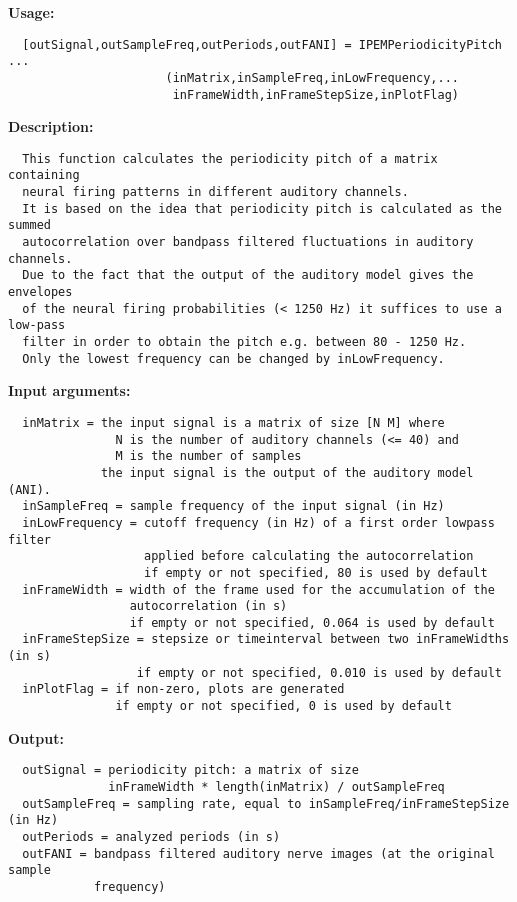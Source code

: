 \textbf{Usage:}
\begin{verbatim}  [outSignal,outSampleFreq,outPeriods,outFANI] = IPEMPeriodicityPitch ...
                      (inMatrix,inSampleFreq,inLowFrequency,...
                       inFrameWidth,inFrameStepSize,inPlotFlag)

\end{verbatim}
\textbf{Description:}
\begin{verbatim}  This function calculates the periodicity pitch of a matrix containing 
  neural firing patterns in different auditory channels. 
  It is based on the idea that periodicity pitch is calculated as the summed
  autocorrelation over bandpass filtered fluctuations in auditory channels. 
  Due to the fact that the output of the auditory model gives the envelopes
  of the neural firing probabilities (< 1250 Hz) it suffices to use a low-pass
  filter in order to obtain the pitch e.g. between 80 - 1250 Hz.
  Only the lowest frequency can be changed by inLowFrequency.

\end{verbatim}
\textbf{Input arguments:}
\begin{verbatim}  inMatrix = the input signal is a matrix of size [N M] where
               N is the number of auditory channels (<= 40) and 
               M is the number of samples
             the input signal is the output of the auditory model (ANI).
  inSampleFreq = sample frequency of the input signal (in Hz)
  inLowFrequency = cutoff frequency (in Hz) of a first order lowpass filter
                   applied before calculating the autocorrelation
                   if empty or not specified, 80 is used by default
  inFrameWidth = width of the frame used for the accumulation of the
                 autocorrelation (in s)
                 if empty or not specified, 0.064 is used by default
  inFrameStepSize = stepsize or timeinterval between two inFrameWidths (in s)
                  if empty or not specified, 0.010 is used by default
  inPlotFlag = if non-zero, plots are generated
               if empty or not specified, 0 is used by default

\end{verbatim}
\textbf{Output:}
\begin{verbatim}  outSignal = periodicity pitch: a matrix of size
              inFrameWidth * length(inMatrix) / outSampleFreq 
  outSampleFreq = sampling rate, equal to inSampleFreq/inFrameStepSize (in Hz)
  outPeriods = analyzed periods (in s)
  outFANI = bandpass filtered auditory nerve images (at the original sample
            frequency)

\end{verbatim}
